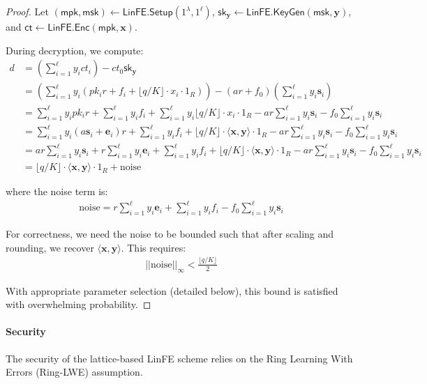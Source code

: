 \begin{proof}
Let $(\mathsf{mpk}, \mathsf{msk}) \leftarrow \mathsf{LinFE.Setup}(1^\lambda, 1^\ell)$, $\mathsf{sk}_{\mathbf{y}} \leftarrow \mathsf{LinFE.KeyGen}(\mathsf{msk}, \mathbf{y})$, and $\mathsf{ct} \leftarrow \mathsf{LinFE.Enc}(\mathsf{mpk}, \mathbf{x})$.

During decryption, we compute:
\begin{align*}
d &= \left(\sum_{i=1}^\ell y_i ct_i\right) - ct_0 \mathsf{sk}_{\mathbf{y}} \\
&= \left(\sum_{i=1}^\ell y_i (pk_i r + f_i + \lfloor q/K \rfloor \cdot x_i \cdot 1_R)\right) - (ar + f_0) \left(\sum_{i=1}^\ell y_i \mathbf{s}_i\right) \\
&= \sum_{i=1}^\ell y_i pk_i r + \sum_{i=1}^\ell y_i f_i + \sum_{i=1}^\ell y_i \lfloor q/K \rfloor \cdot x_i \cdot 1_R - ar \sum_{i=1}^\ell y_i \mathbf{s}_i - f_0 \sum_{i=1}^\ell y_i \mathbf{s}_i \\
&= \sum_{i=1}^\ell y_i (a\mathbf{s}_i + \mathbf{e}_i) r + \sum_{i=1}^\ell y_i f_i + \lfloor q/K \rfloor \cdot \langle \mathbf{x}, \mathbf{y} \rangle \cdot 1_R - ar \sum_{i=1}^\ell y_i \mathbf{s}_i - f_0 \sum_{i=1}^\ell y_i \mathbf{s}_i \\
&= ar \sum_{i=1}^\ell y_i \mathbf{s}_i + r \sum_{i=1}^\ell y_i \mathbf{e}_i + \sum_{i=1}^\ell y_i f_i + \lfloor q/K \rfloor \cdot \langle \mathbf{x}, \mathbf{y} \rangle \cdot 1_R - ar \sum_{i=1}^\ell y_i \mathbf{s}_i - f_0 \sum_{i=1}^\ell y_i \mathbf{s}_i \\
&= \lfloor q/K \rfloor \cdot \langle \mathbf{x}, \mathbf{y} \rangle \cdot 1_R + \text{noise}
\end{align*}

where the noise term is:
\begin{align*}
\text{noise} = r \sum_{i=1}^\ell y_i \mathbf{e}_i + \sum_{i=1}^\ell y_i f_i - f_0 \sum_{i=1}^\ell y_i \mathbf{s}_i
\end{align*}

For correctness, we need the noise to be bounded such that after scaling and rounding, we recover $\langle \mathbf{x}, \mathbf{y} \rangle$. This requires:
\begin{align*}
||\text{noise}||_\infty < \frac{\lfloor q/K \rfloor}{2}
\end{align*}

With appropriate parameter selection (detailed below), this bound is satisfied with overwhelming probability.
\end{proof}

\paragraph{Security}
The security of the lattice-based LinFE scheme relies on the Ring Learning With Errors (Ring-LWE) assumption.

